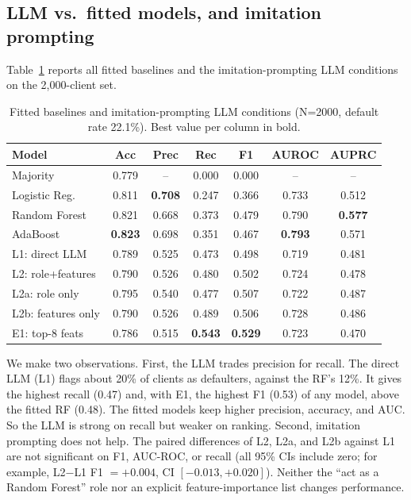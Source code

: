 \documentclass[conference]{IEEEtran}
\begin{document}
\subsection{LLM vs.\ fitted models, and imitation prompting}
Table~\ref{tab:main} reports all fitted baselines and the imitation-prompting LLM conditions on the 2{,}000-client set.

\begin{table}[!t]
\caption{Fitted baselines and imitation-prompting LLM conditions (N=2000, default rate 22.1\%). Best value per column in bold.}
\label{tab:main}
\centering
\setlength{\tabcolsep}{3pt}
\footnotesize
\begin{tabular}{lcccccc}
\toprule
Model & Acc & Prec & Rec & F1 & AUROC & AUPRC \\
\midrule
Majority          & 0.779 & --    & 0.000 & 0.000 & --    & --    \\
Logistic Reg.     & 0.811 & \textbf{0.708} & 0.247 & 0.366 & 0.733 & 0.512 \\
Random Forest     & 0.821 & 0.668 & 0.373 & 0.479 & 0.790 & \textbf{0.577} \\
AdaBoost          & \textbf{0.823} & 0.698 & 0.351 & 0.467 & \textbf{0.793} & 0.571 \\
\midrule
L1: direct LLM    & 0.789 & 0.525 & 0.473 & 0.498 & 0.719 & 0.481 \\
L2: role+features & 0.790 & 0.526 & 0.480 & 0.502 & 0.724 & 0.478 \\
L2a: role only    & 0.795 & 0.540 & 0.477 & 0.507 & 0.722 & 0.487 \\
L2b: features only& 0.790 & 0.526 & 0.489 & 0.506 & 0.728 & 0.486 \\
E1: top-8 feats   & 0.786 & 0.515 & \textbf{0.543} & \textbf{0.529} & 0.723 & 0.470 \\
\bottomrule
\end{tabular}
\end{table}

We make two observations. First, the LLM trades precision for recall. The direct LLM (L1) flags about 20\% of clients as defaulters, against the RF's 12\%. It gives the highest recall (0.47) and, with E1, the highest F1 (0.53) of any model, above the fitted RF (0.48). The fitted models keep higher precision, accuracy, and AUC. So the LLM is strong on recall but weaker on ranking. Second, imitation prompting does not help. The paired differences of L2, L2a, and L2b against L1 are not significant on F1, AUC-ROC, or recall (all 95\% CIs include zero; for example, L2$-$L1 F1 $=+0.004$, CI $[-0.013,+0.020]$). Neither the ``act as a Random Forest'' role nor an explicit feature-importance list changes performance.
\end{document}
